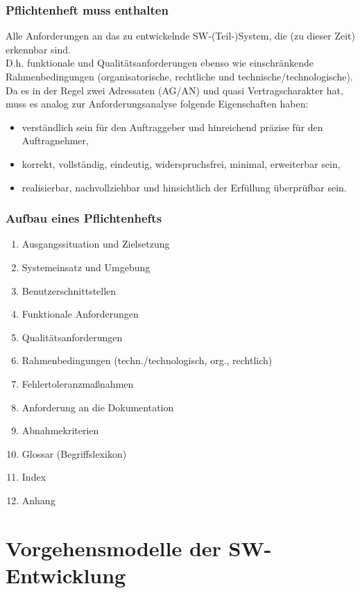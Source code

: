 \subsection{Pflichtenheft muss enthalten}
Alle Anforderungen an das zu entwickelnde SW‐(Teil‐)System, die (zu dieser Zeit) erkennbar sind.\\
D.h. funktionale und Qualitätsanforderungen ebenso wie einschränkende Rahmenbedingungen (organisatorische, rechtliche und technische/technologische).\\
Da es in der Regel zwei Adressaten (AG/AN) und quasi Vertragscharakter hat,
muss es analog zur Anforderungsanalyse folgende Eigenschaften haben:
\begin{itemize}
\item verständlich sein für den Auftraggeber und hinreichend präzise für den
Auftragnehmer,
\item korrekt, vollständig, eindeutig, widerspruchsfrei, minimal, erweiterbar sein,
\item realisierbar, nachvollziehbar und hinsichtlich der Erfüllung überprüfbar sein. 
\end{itemize}

\subsection{Aufbau eines Pflichtenhefts}
\begin{enumerate}
\item Ausgangssituation und Zielsetzung
\item Systemeinsatz und Umgebung
\item Benutzerschnittstellen
\item Funktionale Anforderungen
\item Qualitätsanforderungen
\item Rahmenbedingungen (techn./technologisch, org., rechtlich)
\item Fehlertoleranzmaßnahmen
\item Anforderung an die Dokumentation
\item Abnahmekriterien
\item[] Glossar (Begriffslexikon)
\item[] Index
\item[] Anhang
\end{enumerate}


\chapter{Vorgehensmodelle der SW-Entwicklung}

